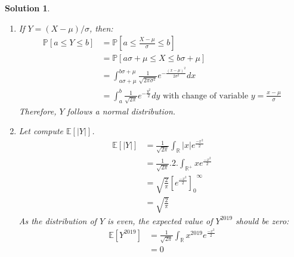 \documentclass{article}
\newcommand{\proba}[1]{\mathbb{P}[#1]}
\newcommand{\esperance}[1]{\mathbb{E}[#1]}
\newcommand{\R}{\mathbb{R}}
\newtheorem{solution}{Solution}
\begin{document}
\begin{solution}
  \begin{enumerate}
    \item If $Y=(X-\mu)/\sigma$, then:
          \begin{align*}
            \proba{a \leq Y \leq b} & = \proba{a \leq \frac{X-\mu}{\sigma} \leq b}                                                                     \\
                                    & = \proba{a\sigma + \mu \leq X \leq b\sigma + \mu}                                                                \\
                                    & = \int_{a\sigma + \mu}^{b\sigma + \mu} \frac{1}{\sqrt{2\pi \sigma^2}} e^{-\frac{{(x-\mu)}^2}{2\sigma^2}} dx      \\
                                    & = \int_a^b \frac{1}{\sqrt{2\pi}} e^{-\frac{y^2}{2}} dy \text{ with change of variable } y = \frac{x-\mu}{\sigma}
          \end{align*}
          Therefore, $Y$ follows a normal distribution.
    \item Let compute $\esperance{|Y|}$.
          \begin{align*}
            \esperance{|Y|} & = \frac{1}{\sqrt{2\pi}} \int_\R |x| e^{\frac{-x^2}{2}}                \\
                            & = \frac{1}{\sqrt{2\pi}}.2. \int_{\R^+} x e^{\frac{-x^2}{2}}           \\
                            & = \sqrt{\frac{2}{\pi}} {{\left[ e^{\frac{-x^2}{2}} \right]}_0}^\infty \\
                            & = \sqrt{\frac{2}{\pi}}
          \end{align*}
          As the distribution of $Y$ is even, the expected value of $Y^{2019}$ should be zero:
          \begin{align*}
            \esperance{Y^{2019}} & = \frac{1}{\sqrt{2\pi}} \int_\R x^{2019} e^{\frac{-x^2}{2}} \\
                                 & = 0
          \end{align*}
  \end{enumerate}
\end{solution}
\end{document}
